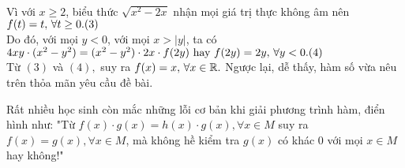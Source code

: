 \begin{bt}
{\begin{itemize}
{\begin{align*}
			\end{align*}}Vì với $x\ge 2$, biểu thức $\sqrt{x^2-2x}$ nhận mọi giá trị thực không âm nên $f(t)=t,\,\forall t\ge 0.\hfill (3)$\\
			Do đó, với mọi $y<0$, với mọi $x>|y|$, ta có\\
			$4xy\cdot (x^2-y^2)=(x^2-y^2)\cdot 2x\cdot f(2y) \text{ hay }f(2y)=2y,\,\forall y <0.\hfill (4) $\\
			Từ $(3)$ và $(4),$ suy ra $f(x)=x, \, \forall x\in \Bbb{R}.$ Ngược lại, dễ thấy, hàm số vừa nêu trên thỏa mãn yêu cầu đề bài.
\end{itemize}
			\begin{nx}
					 Rất nhiều học sinh còn mắc những lỗi cơ bản khi giải phương trình hàm, điển hình như:
					"Từ $f(x)\cdot g(x)=h(x)\cdot g(x), \forall x\in M$ suy ra $f(x)=g(x), \forall x\in M$, mà không hề kiểm tra $g(x)$ có khác $0$ với mọi $x\in M$ hay không!" 
			\end{nx}
}
	
\end{bt}

